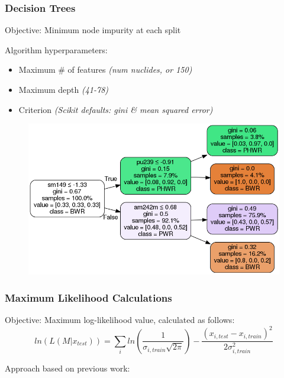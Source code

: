 \begin{frame}
  \frametitle{Decision Trees}
  \begin{adjustwidth}{-10pt}{0pt}
  \begin{minipage}{0.4\textwidth}
    \begin{block}{Objective:}
      Minimum node impurity at each split
    \end{block}
    \begin{block}{Algorithm hyperparameters:}
      \begin{itemize}
        \item Maximum \# of features \textit{(num nuclides, or 150)}
        \item Maximum depth \textit{(41-78)}
        \item Criterion \textit{(Scikit defaults: gini \& mean squared error)}
      \end{itemize}
    \end{block}
  \end{minipage}
  \hfill
  \begin{minipage}{0.6\textwidth}
    \begin{figure}
      \centering
      \includegraphics[width=\textwidth]{./figures/dtree.png}
    \end{figure}
  \end{minipage}
  \end{adjustwidth}
\end{frame}

\begin{frame}
  \frametitle{Maximum Likelihood Calculations}
  \begin{block}{Objective:}
    Maximum log-likelihood value, calculated as follows:
    \[
      ln(L(M|x_{test})) = \sum_i ln(\frac{1}{\sigma_{i,train} \sqrt{2\pi}}) - 
                          \frac{(x_{i,test} - x_{i,train})^2}{2 \sigma_{i,train}^2}
    \]  
  \end{block}
  Approach based on previous work: \cite{mll_method}

\end{frame}
